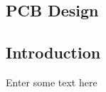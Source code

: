 
\vspace*{8.5cm}

\begin{flushright}
	\section{PCB Design}
\end{flushright}

\subsection{Introduction}
	Enter some text here